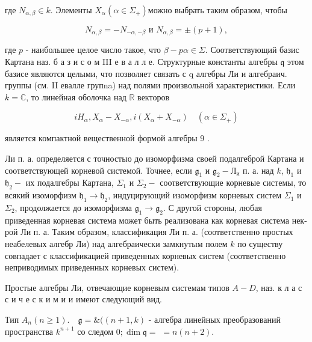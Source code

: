 \documentclass[10pt]{article}
\begin{document}
где $N_{\alpha, \beta} \in k$. Элементы $X_{\alpha}\left(\alpha \in \Sigma_{+}\right)$можно выбрать таким образом, чтобы



\[

N_{\alpha, \beta}=-N_{-\alpha,-\beta} \text { и } N_{\alpha, \beta}= \pm(p+1),

\]



где $p$ - наибольшее целое число такое, что $\beta-p \alpha \in \Sigma$. Соответствующий базис Картана наз. б а з и с о м III е в а л л е. Структурные константы алгебры $\mathfrak{q}$ этом базисе являются целыми, что позволяет связать с q алгебры Ли и алгебраич. группы (см. II евалле групna) над полями произвольной характеристики. Если $k=\mathbb{C}$, то линейная оболочка над $\mathbb{R}$ векторов



\[

i H_{\alpha}, X_{\alpha}-X_{-\alpha}, i\left(X_{\alpha}+X_{-\alpha}\right) \quad\left(\alpha \in \Sigma_{+}\right)

\]



является компактной вещественной формой алгебры 9 .



Ли п. а. определяется с точностыо до изоморфизма своей подалгеброй Картана и соответствующей корневой системой. Точнее, если $\mathfrak{g}_{1}$ и $\mathfrak{g}_{2}-Л_{и}$ п. а. над $k$, $\mathfrak{h}_{1}$ и $\mathfrak{h}_{2}-$ их подалгебры Картана, $\Sigma_{1}$ и $\Sigma_{2}-$ соответствующие корневые системы, то всякий изоморфизм $\mathfrak{h}_{1} \rightarrow \mathfrak{h}_{2}$, индуцирующий изоморфизм корневых систем $\Sigma_{1}$ и $\Sigma_{2}$, продолжается до изоморфизма $\mathfrak{g}_{1} \rightarrow \mathfrak{g}_{2}$. С другой стороны, любая приведенная корневая система может быть реализована как корневая система нек-рой Ли п. а. Таким образом, классификация Ли п. а. (соответственно простых неабелевых алгебр Ли) над алгебраически замкнутым полем $k$ по существу совпадает с классификацией приведенных корневых систем (соответственно неприводимых приведенных корневых систем).



Простые алгебры Ли, отвечающие корневым системам типов $A-D$, наз. к л а с с и ч е с к и м и и имеют следующий вид.



Тип $A_{n}(n \geqslant 1) . \quad \mathfrak{g}=\mathfrak{\&}((n+1, k)$ - алгебра линейных преобразований пространства $k^{n+1}$ со следом $0 ; \operatorname{dim} \mathfrak{q}=$ $=n(n+2)$.
\end{document}
